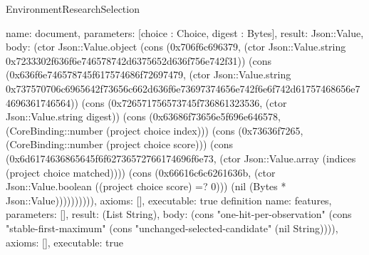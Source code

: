 \begin{lexlean}{EnvironmentResearchSelection}
\begin{semanticmodule}
{ name: document, parameters: [choice : Choice, digest : Bytes], result: Json::Value,
 body: (ctor Json::Value.object (cons (0x706f6c696379, (ctor Json::Value.string 0x7233302f636f6e746578742d6375652d636f756e742f31)) (cons (0x636f6e746578745f617574686f72697479, (ctor Json::Value.string 0x737570706c6965642f73656c662d636f6e73697374656e742f6e6f742d61757468656e74696361746564)) (cons (0x726571756573745f736861323536, (ctor Json::Value.string digest)) (cons (0x63686f73656e5f696e646578, (CoreBinding::number (project choice index))) (cons (0x73636f7265, (CoreBinding::number (project choice score))) (cons (0x6d6174636865645f6f62736572766174696f6e73, (ctor Json::Value.array (indices (project choice matched)))) (cons (0x66616c6c6261636b, (ctor Json::Value.boolean ((project choice score) =? 0))) (nil (Bytes * Json::Value)))))))))),
 axioms: [], executable: true
}
definition{
 name: features, parameters: [], result: (List String),
 body: (cons "one-hit-per-observation" (cons "stable-first-maximum" (cons "unchanged-selected-candidate" (nil String)))),
 axioms: [], executable: true
}
\end{semanticmodule}
\end{lexlean}
